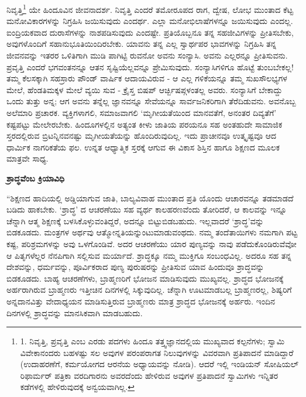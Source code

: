 ನಿವೃತ್ತಿ\footnote{1. ನಿವೃತ್ತಿ, ಪ್ರವೃತ್ತಿ ಎಂಬ ಎರಡು ಪದಗಳು ಹಿಂದೂ ತತ್ತ್ವಜ್ಞಾನದಲ್ಲಿಯ ಮುಖ್ಯವಾದ ಕಲ್ಪನೆಗಳು; ಸ್ವಾಮಿ ವಿವೇಕಾನಂದರು ಬಹಳಷ್ಟು ಸಲ ಅವುಗಳ ಪರಂಪರಾಗತ ನಿಲುವುಗಳನ್ನು ವಿವರವಾಗಿ ಪ್ರತಿಪಾದನೆ ಮಾಡಿದ್ದಾರೆ (ಉದಾಹರಣೆಗೆ, ಕರ್ಮಯೋಗದ ಆರನೆಯ ಅಧ್ಯಾಯವನ್ನು ನೋಡಿ). ಆದರೆ ಇಲ್ಲಿ ಇಂಡಿಯನ್ ಸೋಷಿಯಲ್ ರಿಫಾರ್ಮರ್ ಪತ್ರಿಕಾ ವರದಿಗಾರನು ಅವರದೆಂದು ಹೇಳಿರುವ ಅವುಗಳ ಪ್ರತಿಪಾದನೆ ಸ್ವಾಮಿಗಳು ಇನ್ನಿತರ ಕಡೆಗಳಲ್ಲಿ ಹೇಳಿರುವುದಕ್ಕೆ ಅನ್ವಯವಾಗಿಲ್ಲ.} ಯೇ ಹಿಂದೂವಿನ ಜೀವನಾದರ್ಶ. ನಿವೃತ್ತಿ ಎಂದರೆ ತಮೋರೂಪದ ರಾಗ, ದ್ವೇಷ, ಲೋಭ ಮುಂತಾದ ಕೆಟ್ಟ ಮನೋವಿಕಾರಗಳನ್ನು ನಿಗ್ರಹಿಸಿ ಜಯಿಸುವುದು ಎಂದರ್ಥ. ಎಲ್ಲಾ ಮನೋಭಿಲಾಷೆಗಳನ್ನೂ ಜಯಿಸುವುದು ಎಂದಲ್ಲ. ಐಂದ್ರಿಯಕವಾದ ದುರಾಸೆಗಳನ್ನು ನಾಶಪಡಿಸುವುದು ಎಂದಷ್ಟೇ. ಪ್ರತಿಯೊಬ್ಬನೂ ತನ್ನ ಸಹಜೀವಿಗಳನ್ನು ಪ್ರೀತಿಸಬೇಕು, ಅವುಗಳೊಂದಿಗೆ ಸಹಾನುಭೂತಿಯಿಂದಿರಬೇಕು. ಯಾವನು ತನ್ನ ಎಲ್ಲ ಸ್ವಾರ್ಥಪರ ಭಾವಗಳನ್ನು ನಿಗ್ರಹಿಸಿ ತನ್ನ ಜೀವನವನ್ನು ಇತರರ ಒಳಿತಿಗಾಗಿ ಮುಡಿ ಪಾಗಿಟ್ಟಿ ರುವನೋ ಅವನು ಸಂನ್ಯಾಸಿ. ಅವನು ಎಲ್ಲರನ್ನೂ ಪ್ರೀತಿಸುವನು. ಪ್ರವೃತ್ತಿ ಎಂದರೆ ಭಗವಂತನನ್ನೂ ಆತನ ಸೃಷ್ಟಿಯೆಲ್ಲವನ್ನೂ ಪ್ರೇಮಿಸುವುದು. ಸಂನ್ಯಾಸಿಗಳಿಗೂ ಹೊಟ್ಟೆ ತುಂಬಬೇಕಲ್ಲ! ತಮ್ಮ ಕೆಲಸಕ್ಕಾಗಿ ಸಹಸ್ರಾರು ಪೌಂಡ್ ವಾರ್ಷಿಕ ಆದಾಯವಿರುವ - ಆ ಎಲ್ಲ ಗಳಿಕೆಯನ್ನೂ ತಮ್ಮ ಸುಖಸೌಲಭ್ಯಗಳ ಮೇಲೆ, ಹೆಂಡತಿಮಕ್ಕಳ ಮೇಲೆ ವ್ಯಯಿ ಸುವ - ಕ್ರೈಸ್ತ ಬಿಷಪ್ ಆರ್ಚ್ಬಿಷಪ್ಗಳಂತಲ್ಲ ಅವರು. ಸಂನ್ಯಾಸಿಗೆ ಬೇಕಾದ್ದು ಒಂದು ತುತ್ತು ಅನ್ನ; ಆಗ ಅವನು ತನ್ನೆಲ್ಲ ಜ್ಞಾನವನ್ನೂ ಸೇವೆಯನ್ನೂ ಸಾರ್ವಜನಿಕರಿಗಾಗಿ ತೆರೆದಿಡುವನು. ಅವನೊಬ್ಬ ಅಲೆಮಾರಿ ಪ್ರಚಾರಕ. ವ್ಯಕ್ತಿಗಳಾಗಲಿ, ಸಮಾಜವಾಗಲಿ ‘ಮೃಗೀಯತೆಯಿಂದ ಮಾನವತೆಗೆ, ಅನಂತರ ದಿವ್ಯತೆಗೆ’ ಕಷ್ಟಪಟ್ಟು ಮೇಲೇರಬೇಕು. ಹಿಂದೂಗಳಲ್ಲಿನ ಅತ್ಯಂತ ಕೀಳು ಜಾತಿಯ ಪರಯನೂ ಸಹ ಅಂತಹುದೇ ಸಾಮಾಜಿಕ ಸ್ತರದಲ್ಲಿರುವ ಬ್ರಿಟನ್ನಿನವನಷ್ಟು ಮೃಗೀಯತೆಯನ್ನು ಹೊಂದಿರುವುದಿಲ್ಲ. ಇದು ಪ್ರಾಚೀನವೂ ಉತ್ಕೃಷ್ಟವೂ ಆದ ಧಾರ್ಮಿಕ ನಾಗರಿಕತೆಯ ಫಲ. ಉನ್ನತ ಆಧ್ಯಾತ್ಮಿಕ ಸ್ತರಕ್ಕೆ ಆಗುವ ಈ ವಿಕಾಸ ಶಿಸ್ತಿನ ಹಾಗೂ ಶಿಕ್ಷಣದ ಮೂಲಕ ಮಾತ್ರವೇ ಸಾಧ್ಯ.

\begin{center}
\textbf{ಶ್ರಾದ್ಧವೆಂಬ ಕ್ರಿಯಾವಿಧಿ}
\end{center}

“ಶಿಕ್ಷಣದ ಹಾದಿಯಲ್ಲಿ ಅಡ್ಡಿಯಾಗುವ ಜಾತಿ, ಬಾಲ್ಯವಿವಾಹ ಮುಂತಾದ ಪ್ರತಿ ಯೊಂದು ಆಚಾರವನ್ನೂ ತಡಮಾಡದೆ ಬಡಿದು ಹಾಕಬೇಕು. ‘ಶ್ರಾದ್ಧ’ ದ ಆಚರಣೆಯು ಸಹ ವ್ಯರ್ಥ ಕಾಲಹರಣವೆಂದು ತೋರಿದರೆ, ಆ ಕಾಲವನ್ನು ಇನ್ನೂ ಚೆನ್ನಾಗಿ ಆತ್ಮ ಶಿಕ್ಷಣಕ್ಕೆ ಬಳಸಿಕೊಳ್ಳುವಂತಿದ್ದರೆ, ಅದನ್ನೂ ಬಿಟ್ಟುಬಿಡಬಹುದು. ಇಲ್ಲವಾದರೆ ‘ಶ್ರಾದ್ಧ’ವನ್ನು ಬಿಡಕೂಡದು. ಮಂತ್ರಗಳ ಅರ್ಥವು ಆತ್ಮೋನ್ನತಿಯನ್ನುಂಟುಮಾಡುವಂಥದು. ನಮ್ಮ ತಂದೆತಾಯಿಗಳು ನಮಗಾಗಿ ಪಟ್ಟ ಕಷ್ಟ, ಪರಿಶ್ರಮಗಳನ್ನು ಅವು ಒಳಗೊಂಡಿವೆ. ಅದರ ಆಚರಣೆಯು ಯಾರ ಪುಣ್ಯವನ್ನು ನಾವು ಪಡೆದುಕೊಂಡಿರುವೆವೋ ಆ ಪಿತೃಗಳೆಲ್ಲರ ನೆನಪಿಗಾಗಿ ಸಲ್ಲಿಸುವ ಮರ್ಯಾದೆ. ಶ್ರಾದ್ಧಕ್ಕೂ ನಮ್ಮ ಮುಕ್ತಿಗೂ ಸಂಬಂಧವಿಲ್ಲ. ಅದರೂ ಸಹ ತನ್ನ ದೇಶವನ್ನು, ಧರ್ಮವನ್ನು, ಪೂರ್ವಿಕರಾದ ಪುಣ್ಯ ಪುರುಷರನ್ನು ಪ್ರೀತಿಸುವ ಯಾವ ಹಿಂದುವೂ ಶ್ರಾದ್ಧವನ್ನು ಬಿಡಕೂಡದು. ಬಾಹ್ಯ ಆಚರಣೆಗಳು, ಬ್ರಾಹ್ಮಣರಿಗೆ ಭೋಜನ ಮಾಡಿಸುವುದು ಮುಖ್ಯವಲ್ಲ. ಶ್ರಾದ್ಧದ ಭೋಜನಕ್ಕೆ ಅರ್ಹರಾಗಿರುವ ಬ್ರಾಹ್ಮಣರು ಇತ್ತೀಚಿನ ದಿನಗಳಲ್ಲಿ ಸಿಕ್ಕುವುದಿಲ್ಲ. ಚೆನ್ನಾಗಿ ಊಟಮಾಡಬಲ್ಲ ಬ್ರಾಹ್ಮಣರಲ್ಲ, ಶಿಷ್ಯರಿಗೆ ಅನ್ನದಾನವಿತ್ತು ವೇದಾಧ್ಯಯನ ಮಾಡಿಸುತ್ತಿರುವ ಬ್ರಾಹ್ಮಣರು ಮಾತ್ರ ಶ್ರಾದ್ಧದ ಭೋಜನಕ್ಕೆ ಅರ್ಹರು. ಇಂದಿನ ದಿನಗಳಲ್ಲಿ ಶ್ರಾದ್ಧವನ್ನು ಮಾನಸಿಕವಾಗಿ ಮಾಡಬಹುದು.

